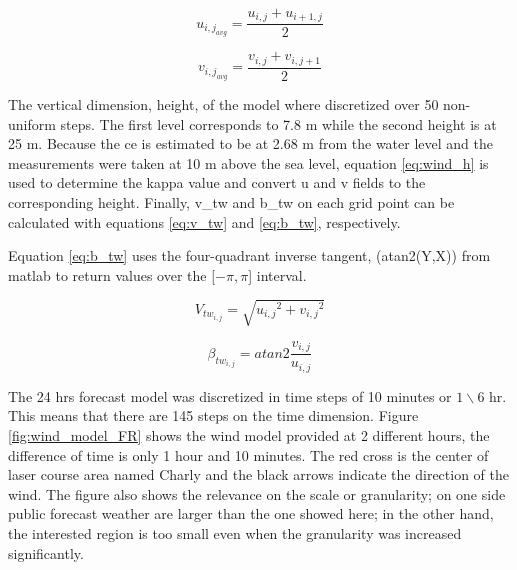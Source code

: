 \begin{equation} \label{eq:hor_AVG_velu}
    u_{{i,j}_{avg}}=\frac{ u_{i,j} + u_{{i+1},j} } {2}
\end{equation}

\begin{equation} \label{eq:hor_AVG_velv}
    v_{{i,j}_{avg}}=\frac{ v_{i,j} + v_{i,{j+1}} } {2}
\end{equation}

The vertical dimension, height, of the model where discretized over 50 non-uniform steps. The first level corresponds to 7.8 m while the second height is at 25 m. Because the \acrshort{ce} is estimated to be at 2.68 m from the water level \cite{pennanen2015optimal} and the measurements were taken at 10 m above the sea level, equation \ref{eq:wind_h} is used to determine the \acrshort{kappa} value and convert \acrshort{u} and \acrshort{v} fields to the corresponding height. Finally, \acrshort{v_tw} and \acrshort{b_tw} on each grid point can be calculated with equations \ref{eq:v_tw} and \ref{eq:b_tw}, respectively. \par \noindent Equation \ref{eq:b_tw} uses the four-quadrant inverse tangent, (atan2(Y,X)) from \acrshort{matlab} to return values over the [$- \pi, \pi  $] interval.%

\begin{equation}\label{eq:v_tw}
    V_{tw_{i,j}}=\sqrt{{u_{i,j}}^2+{v_{i,j}}^2}
\end{equation}

\begin{equation}\label{eq:b_tw}
    \beta_{tw_{i,j}}= atan2 \frac {v_{i,j}}{u_{i,j}}
\end{equation}

The 24 hrs forecast model was discretized in time steps of 10 minutes or ${1} \backslash {6}$ hr. This means that there are 145 steps on the time dimension. Figure \ref{fig:wind_model_FR} shows the wind model provided at 2 different hours, the difference of time is only 1 hour and 10 minutes. The red cross is the center of laser course area named Charly and the black arrows indicate the direction of the wind. The figure also shows the relevance on the scale or granularity; on one side public forecast weather are larger than the one showed here; in the other hand, the interested region is too small even when the granularity was increased significantly. \par    

